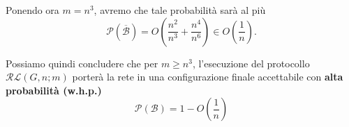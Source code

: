Ponendo ora $m = n^3$, avremo che tale probabilità sarà al più
\[
    \mathcal{P}(\overline{\mathcal{B}}) = O\left(\frac{n^2}{n^3} + \frac{n^4}{n^6}\right) \in O\left(\frac{1}{n}\right).
\]

Possiamo quindi concludere che per $m \geq n^3$, l'esecuzione del protocollo $\mathcal{RL}(G, n; m)$ porterà la rete in una configurazione finale accettabile con \textbf{alta probabilità (w.h.p.)} 
\[
    \mathcal{P}(\mathcal{B}) = 1 - O\left(\frac{1}{n}\right)
\]
